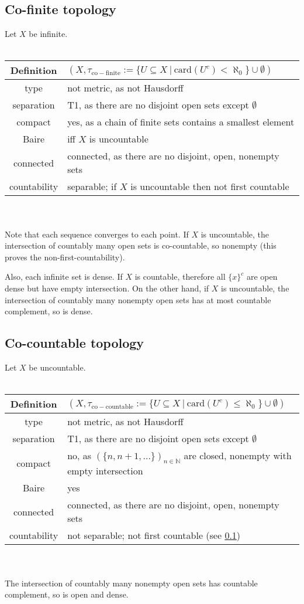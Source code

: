 \documentclass{scrartcl}
\newcommand{\N}{\mathbb{N}}
\begin{document}
\subsection{Co-finite topology}
\label{top:co_finite}
Let $X$ be infinite.
\\\\
\begin{tabular}{c | p{}}
    Definition & $(X, \tau_{\mathrm{co-finite}} := \{U \subseteq X \ | \ \mathrm{card}(U^c) < \aleph_0 \} \cup \emptyset)$ \\
    \hline
    type & not metric, as not Hausdorff \\
    separation & T1, as there are no disjoint open sets except $\emptyset$ \\
    compact & yes, as a chain of finite sets contains a smallest element \\
    Baire & iff $X$ is uncountable \\
    connected & connected, as there are no disjoint, open, nonempty sets \\
    countability & separable; if $X$ is uncountable then not first countable
\end{tabular}
\\\\
Note that each sequence converges to each point. If $X$ is uncountable, the intersection of countably many open sets is co-countable, so nonempty (this proves the non-first-countability).

Also, each infinite set is dense. If $X$ is countable, therefore all $\{x\}^c$ are open dense but have empty intersection. On the other hand, if $X$ is uncountable, the intersection of countably many nonempty open sets has at most countable complement, so is dense. 

\subsection{Co-countable topology}
\label{top:co_countable}
Let $X$ be uncountable.
\\\\
\begin{tabular}{c | p{}}
    Definition & $(X, \tau_{\mathrm{co-countable}} := \{U \subseteq X \ | \ \mathrm{card}(U^c) \leq \aleph_0 \} \cup \emptyset)$ \\
    \hline
    type & not metric, as not Hausdorff \\
    separation & T1, as there are no disjoint open sets except $\emptyset$ \\
    compact & no, as $(\{n, n+1, ...\})_{n \in \N}$ are closed, nonempty with empty intersection \\
    Baire & yes \\
    connected & connected, as there are no disjoint, open, nonempty sets \\
    countability & not separable; not first countable (see \ref{top:co_finite})
\end{tabular}
\\\\
The intersection of countably many nonempty open sets has countable complement, so is open and dense.
\end{document}
